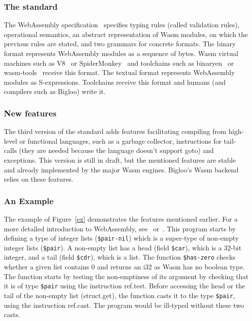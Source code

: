 \documentclass[a4paper,11pt]{article}
\begin{document}
\subsubsection{The standard}
The WebAssembly specification~\cite{WebAssemblyCoreSpecification3} specifies
typing rules (called validation rules), operational semantics, an abstract
representation of Wasm modules, on which the previous rules are stated, and two
grammars for concrete formats. The binary format represents WebAssembly modules
as a sequence of bytes. Wasm virtual machines such as V8~\cite{V8} or
SpiderMonkey~\cite{SpiderMonkey} and toolchains such as binaryen~\cite{Binaryen}
or wasm-tools~\cite{WasmTools} receive this format. The textual format
represents WebAssembly modules as S-expressions. Toolchains receive this format
and humans (and compilers such as Bigloo) write it.

\subsubsection{New features}
The third version of the standard adds features facilitating compiling from
high-level or functional languages, such as a garbage collector, instructions
for tail-calls (they are needed because the language doesn't support goto) and
exceptions. This version is still in draft, but the mentioned features are
stable and already implemented by the major Wasm engines. Bigloo's Wasm backend
relies on these features.

\subsubsection{An Example}
The example of Figure~\ref{ex} demonstrates the features mentioned earlier. For
a more detailed introduction to WebAssembly,
see~\cite[Section~2.1]{phipps2023continuing} or~\cite{haas2017bringing}. This
program starts by defining a type of integer lists (\texttt{\$pair-nil}) which
is a super-type of non-empty integer lists (\texttt{\$pair}). A non-empty list
has a head (field \texttt{\$car}), which is a 32-bit integer, and a tail (field
\texttt{\$cdr}), which is a list. The function \texttt{\$has-zero} checks
whether a given list contains 0 and returns an \textsf{i32} as Wasm has no
boolean type. The function starts by testing the non-emptiness of its argument
by checking that it is of type \texttt{\$pair} using the instruction
\textsf{ref.test}. Before accessing the head or the tail of the non-empty list
(\textsf{struct.get}), the function casts it to the type \texttt{\$pair}, using
the instruction \textsf{ref.cast}. The program would be ill-typed without these
two casts.
\end{document}
